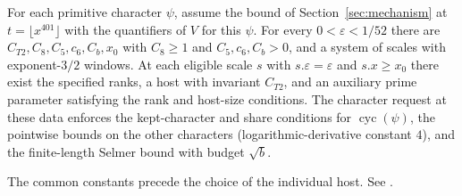 
\begin{formalstatement}\label{sub:B07}
For each primitive character $\psi$, assume the bound of
Section~\ref{sec:mechanism} at $t=\lfloor x^{401}\rfloor$ with the
quantifiers of $V$ for this $\psi$. For every $0<\varepsilon<1/52$
there are $C_{T2},C_8,C_5,c_6,C_b,x_0$ with $C_8\ge1$ and
$C_5,c_6,C_b>0$, and a system of scales with exponent-$3/2$ windows.
At each eligible scale $s$ with $s.\varepsilon=\varepsilon$ and
$s.x\ge x_0$ there exist the specified ranks, a host with invariant
$C_{T2}$, and an auxiliary prime parameter satisfying the rank and
host-size conditions. The character request at these data enforces the
kept-character and share conditions for $\operatorname{cyc}(\psi)$,
the pointwise bounds on the other characters (logarithmic-derivative
constant $4$), and the finite-length Selmer bound with budget $\sqrt b$.
\end{formalstatement}
The common constants precede the choice of the individual host.
See .
